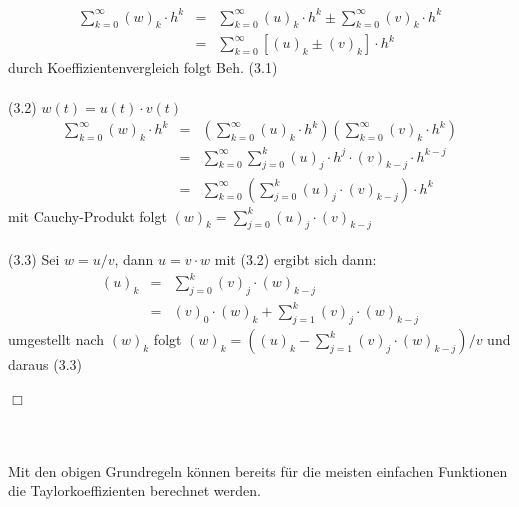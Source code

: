 \documentclass{scrartcl}
\begin{document}
	\begin{eqnarray*}\sum_{k=0}^{\infty} (w)_k \cdot h^k &=& \sum_{k=0}^{\infty} (u)_k \cdot h^k \pm \sum_{k=0}^{\infty} (v)_k \cdot h^k\\
 	&=& \sum_{k=0}^{\infty} \left[(u)_k \pm (v)_k\right] \cdot h^k\end{eqnarray*}
\hspace*{0.5cm}durch Koeffizientenvergleich folgt Beh. (3.1)\\
\\
\hspace*{0.5cm}(3.2) $w(t)= u(t)\cdot v(t)$\\ 
	\begin{eqnarray*}\sum_{k=0}^{\infty} (w)_k \cdot h^k &=& \left(\sum_{k=0}^{\infty} (u)_k \cdot h^k \right)\left( \sum_{k=0}^{\infty} (v)_k \cdot h^k\right)\\
 	&=&  \sum_{k=0}^{\infty} \sum_{j=0}^k (u)_j \cdot h^j \cdot (v)_{k-j} \cdot h^{k-j} \\
 	&=& \sum_{k=0}^{\infty} \left(\sum_{j=0}^k (u)_j \cdot (v)_{k-j}\right) \cdot h^{k}\end{eqnarray*}
\hspace*{0.5cm}mit Cauchy-Produkt folgt $(w)_k = \sum\limits_{j=0}^k (u)_j \cdot (v)_{k-j}$ \\
\\
\hspace*{0.5cm}(3.3) Sei $w= u/v$, dann $u = v \cdot w$ mit (3.2) ergibt sich dann:\\
	\begin{eqnarray*}(u)_k &=& \sum_{j=0}^k (v)_j \cdot (w)_{k-j}\\
	 &=& (v)_0 \cdot (w)_k + \sum_{j=1}^k (v)_j \cdot (w)_{k-j}\end{eqnarray*}
\hspace*{0.5cm}umgestellt nach $(w)_k$ folgt $(w)_k = \left((u)_k - \sum\limits_{j=1}^k(v)_j \cdot (w)_{k-j}\right)/v$ und daraus (3.3)
\begin{flushright}$\Box$\end{flushright}\\
\\
Mit den obigen Grundregeln können bereits für die meisten einfachen Funktionen die Taylorkoeffizienten berechnet werden.\\

\newpage
\end{document}
